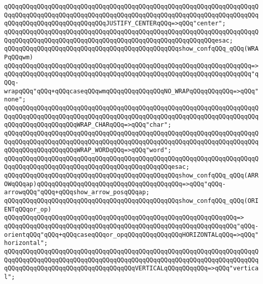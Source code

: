 \verb|qQQqqQQqqQQqqQQqqQQqqQQqqQQqqQQqqQQqqQQqqQQqqQQqqQQqqQQqqQQqqQQqqQQqqQQqqQQqqQQqqQQqqQQqqQQqqQQqqQQqqQQqqQQqqQQqqQQqqQQqqQQqqQQqqQQqqQQqqQQqqQQqqQQqqQQqqQQqqQQqqQQqqQQqJUSTIFY_CENTERqQQq=>qQQq"center";|\newline
\verb|qQQqqQQqqQQqqQQqqQQqqQQqqQQqqQQqqQQqqQQqqQQqqQQqqQQqqQQqqQQqqQQqqQQqqQQqqQQqqQQqqQQqqQQqqQQqqQQqqQQqqQQqqQQqqQQqqQQqqQQqqQQqqQQqesac;|\newline
\newline
\verb|qQQqqQQqqQQqqQQqqQQqqQQqqQQqqQQqqQQqqQQqqQQqqQQqshow_confqQQq_qQQq(WRAPqQQqwm)|\newline
\verb|qQQqqQQqqQQqqQQqqQQqqQQqqQQqqQQqqQQqqQQqqQQqqQQqqQQqqQQqqQQqqQQqqQQq=>|\newline
\verb|qQQqqQQqqQQqqQQqqQQqqQQqqQQqqQQqqQQqqQQqqQQqqQQqqQQqqQQqqQQqqQQqqQQq"qQQq-wrapqQQq"qQQq+qQQqcaseqQQqwmqQQqqQQqqQQqqQQqNO_WRAPqQQqqQQqqQQq=>qQQq"none";|\newline
\verb|qQQqqQQqqQQqqQQqqQQqqQQqqQQqqQQqqQQqqQQqqQQqqQQqqQQqqQQqqQQqqQQqqQQqqQQqqQQqqQQqqQQqqQQqqQQqqQQqqQQqqQQqqQQqqQQqqQQqqQQqqQQqqQQqqQQqqQQqqQQqqQQqqQQqqQQqqQQqqQQqWRAP_CHARqQQq=>qQQq"char";|\newline
\verb|qQQqqQQqqQQqqQQqqQQqqQQqqQQqqQQqqQQqqQQqqQQqqQQqqQQqqQQqqQQqqQQqqQQqqQQqqQQqqQQqqQQqqQQqqQQqqQQqqQQqqQQqqQQqqQQqqQQqqQQqqQQqqQQqqQQqqQQqqQQqqQQqqQQqqQQqqQQqqQQqWRAP_WORDqQQq=>qQQq"word";|\newline
\verb|qQQqqQQqqQQqqQQqqQQqqQQqqQQqqQQqqQQqqQQqqQQqqQQqqQQqqQQqqQQqqQQqqQQqqQQqqQQqqQQqqQQqqQQqqQQqqQQqqQQqqQQqqQQqqQQqqQQqesac;|\newline
\newline
\verb|qQQqqQQqqQQqqQQqqQQqqQQqqQQqqQQqqQQqqQQqqQQqqQQqshow_confqQQq_qQQq(ARROWqQQqap)qQQqqQQqqQQqqQQqqQQqqQQqqQQqqQQqqQQqqQQq=>qQQq"qQQq-arrowqQQq"qQQq+qQQqshow_arrow_posqQQqap;|\newline
\newline
\verb|qQQqqQQqqQQqqQQqqQQqqQQqqQQqqQQqqQQqqQQqqQQqqQQqshow_confqQQq_qQQq(ORIENTqQQqor_op)|\newline
\verb|qQQqqQQqqQQqqQQqqQQqqQQqqQQqqQQqqQQqqQQqqQQqqQQqqQQqqQQqqQQqqQQq=>|\newline
\verb|qQQqqQQqqQQqqQQqqQQqqQQqqQQqqQQqqQQqqQQqqQQqqQQqqQQqqQQqqQQqqQQq"qQQq-orientqQQq"qQQq+qQQqcaseqQQqor_opqQQqqQQqqQQqqQQqHORIZONTALqQQq=>qQQq"horizontal";|\newline
\verb|qQQqqQQqqQQqqQQqqQQqqQQqqQQqqQQqqQQqqQQqqQQqqQQqqQQqqQQqqQQqqQQqqQQqqQQqqQQqqQQqqQQqqQQqqQQqqQQqqQQqqQQqqQQqqQQqqQQqqQQqqQQqqQQqqQQqqQQqqQQqqQQqqQQqqQQqqQQqqQQqqQQqqQQqqQQqqQQqVERTICALqQQqqQQqqQQq=>qQQq"vertical";|\newline
